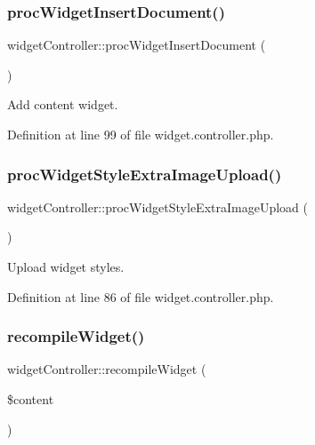 \subsubsection{\texorpdfstring{proc\+Widget\+Insert\+Document()}{procWidgetInsertDocument()}}
{\footnotesize\ttfamily widget\+Controller\+::proc\+Widget\+Insert\+Document (\begin{DoxyParamCaption}{ }\end{DoxyParamCaption})}



Add content widget. 



Definition at line 99 of file widget.\+controller.\+php.

\mbox{\label{classwidgetController_a0abe619fbf8376e7829ade6996c3f707}} 
\subsubsection{\texorpdfstring{proc\+Widget\+Style\+Extra\+Image\+Upload()}{procWidgetStyleExtraImageUpload()}}
{\footnotesize\ttfamily widget\+Controller\+::proc\+Widget\+Style\+Extra\+Image\+Upload (\begin{DoxyParamCaption}{ }\end{DoxyParamCaption})}



Upload widget styles. 



Definition at line 86 of file widget.\+controller.\+php.

\mbox{\label{classwidgetController_a0f43ca1a0a8bff6d4fe8d8aca50d65e1}} 
\subsubsection{\texorpdfstring{recompile\+Widget()}{recompileWidget()}}
{\footnotesize\ttfamily widget\+Controller\+::recompile\+Widget (\begin{DoxyParamCaption}\item[{}]{\$content }\end{DoxyParamCaption})}




